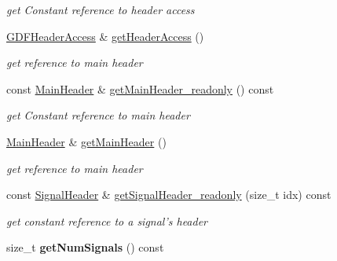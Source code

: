 \begin{DoxyCompactItemize}
\begin{DoxyCompactList}\small\item\em get Constant reference to header access \item\end{DoxyCompactList}\item 
\hypertarget{classgdf_1_1_writer_a52a0d180e34c4860559fddc929527b13}{
\hyperlink{classgdf_1_1_g_d_f_header_access}{GDFHeaderAccess} \& \hyperlink{classgdf_1_1_writer_a52a0d180e34c4860559fddc929527b13}{getHeaderAccess} ()}
\label{classgdf_1_1_writer_a52a0d180e34c4860559fddc929527b13}

\begin{DoxyCompactList}\small\item\em get reference to main header \item\end{DoxyCompactList}\item 
\hypertarget{classgdf_1_1_writer_a99a6e8d6baf70560359b0a1474721011}{
const \hyperlink{classgdf_1_1_main_header}{MainHeader} \& \hyperlink{classgdf_1_1_writer_a99a6e8d6baf70560359b0a1474721011}{getMainHeader\_\-readonly} () const }
\label{classgdf_1_1_writer_a99a6e8d6baf70560359b0a1474721011}

\begin{DoxyCompactList}\small\item\em get Constant reference to main header \item\end{DoxyCompactList}\item 
\hypertarget{classgdf_1_1_writer_a5460055c0f847fee89ae80771e8a52b1}{
\hyperlink{classgdf_1_1_main_header}{MainHeader} \& \hyperlink{classgdf_1_1_writer_a5460055c0f847fee89ae80771e8a52b1}{getMainHeader} ()}
\label{classgdf_1_1_writer_a5460055c0f847fee89ae80771e8a52b1}

\begin{DoxyCompactList}\small\item\em get reference to main header \item\end{DoxyCompactList}\item 
\hypertarget{classgdf_1_1_writer_afcdfc96e12802d0e05848a3222b01566}{
const \hyperlink{classgdf_1_1_signal_header}{SignalHeader} \& \hyperlink{classgdf_1_1_writer_afcdfc96e12802d0e05848a3222b01566}{getSignalHeader\_\-readonly} (size\_\-t idx) const }
\label{classgdf_1_1_writer_afcdfc96e12802d0e05848a3222b01566}

\begin{DoxyCompactList}\small\item\em get constant reference to a signal's header \item\end{DoxyCompactList}\item 
\hypertarget{classgdf_1_1_writer_ad966f79403be1d7ee22114156ca9c832}{
size\_\-t {\bfseries getNumSignals} () const }
\label{classgdf_1_1_writer_ad966f79403be1d7ee22114156ca9c832}


\end{DoxyCompactItemize}
